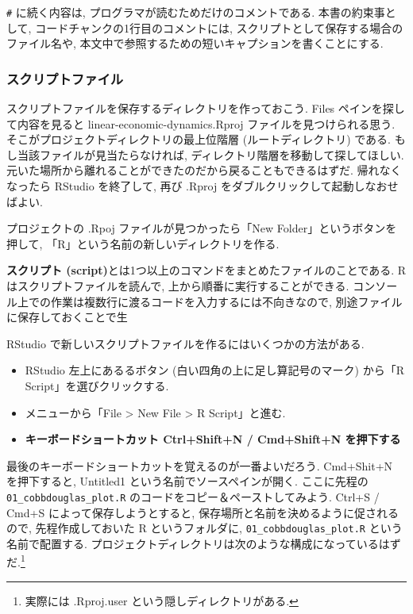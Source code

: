 \documentclass[a4paper]{scrbook}
\providecommand{\tightlist}{%
  \setlength{\itemsep}{0pt}\setlength{\parskip}{0pt}}
\theoremstyle{definition}
\begin{document}
\texttt{\#} に続く内容は, プログラマが読むためだけのコメントである.
本書の約束事として, コードチャンクの1行目のコメントには,
スクリプトとして保存する場合のファイル名や,
本文中で参照するための短いキャプションを書くことにする.

\subsubsection*{スクリプトファイル}

スクリプトファイルを保存するディレクトリを作っておこう. Files
ペインを探して内容を見ると linear-economic-dynamics.Rproj
ファイルを見つけられる思う. そこがプロジェクトディレクトリの最上位階層
(ルートディレクトリ) である. もし当該ファイルが見当たらなければ,
ディレクトリ階層を移動して探してほしい.
元いた場所から離れることができたのだから戻ることもできるはずだ.
帰れなくなったら RStudio を終了して, 再び .Rproj
をダブルクリックして起動しなおせばよい.

プロジェクトの .Rpoj ファイルが見つかったら「New
Folder」というボタンを押して, 「R」という名前の新しいディレクトリを作る.

\textbf{スクリプト
(script)}とは1つ以上のコマンドをまとめたファイルのことである. R
はスクリプトファイルを読んで, 上から順番に実行することができる.
コンソール上での作業は複数行に渡るコードを入力するには不向きなので,
別途ファイルに保存しておくことで生

RStudio で新しいスクリプトファイルを作るにはいくつかの方法がある.

\begin{itemize}
\tightlist
\item
  RStudio 左上にあるるボタン (白い四角の上に足し算記号のマーク) から「R
  Script」を選びクリックする.
\item
  メニューから「File \textgreater{} New File \textgreater{} R
  Script」と進む.
\item
  \textbf{キーボードショートカット Ctrl+Shift+N / Cmd+Shift+N
  を押下する}
\end{itemize}

最後のキーボードショートカットを覚えるのが一番よいだろう. Cmd+Shit+N
を押下すると, Untitled1 という名前でソースペインが開く. ここに先程の
\texttt{01\_cobbdouglas\_plot.R} のコードをコピー＆ペーストしてみよう.
Ctrl+S / Cmd+S によって保存しようとすると,
保存場所と名前を決めるように促されるので, 先程作成しておいた R
というフォルダに, \texttt{01\_cobbdouglas\_plot.R} という名前で配置する.
プロジェクトディレクトリは次のような構成になっているはずだ.\footnote{実際には
  .Rproj.user という隠しディレクトリがある.}
\end{document}
